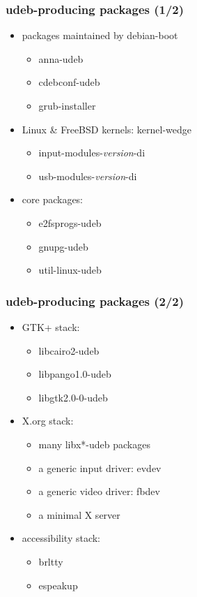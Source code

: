 \documentclass[handout]{beamer}
\begin{document}
\begin{frame}[fragile]
  \frametitle{udeb-producing packages (1/2)}

  \begin{itemize}
  \item packages maintained by debian-boot
    \begin{itemize}
    \item anna-udeb
    \item cdebconf-udeb
    \item grub-installer
    \end{itemize}
  \pause
  \item Linux \& FreeBSD kernels: kernel-wedge
    \begin{itemize}
    \item input-modules-\textit{version}-di
    \item usb-modules-\textit{version}-di
    \end{itemize}
  \pause
  \item core packages:
    \begin{itemize}
    \item e2fsprogs-udeb
    \item gnupg-udeb
    \item util-linux-udeb
    \end{itemize}
  \end{itemize}
\end{frame}

\begin{frame}[fragile]
  \frametitle{udeb-producing packages (2/2)}

  \begin{itemize}
  \item GTK+ stack:
    \begin{itemize}
    \item libcairo2-udeb
    \item libpango1.0-udeb
    \item libgtk2.0-0-udeb
    \end{itemize}
  \pause
  \item X.org stack:
    \begin{itemize}
    \item many libx*-udeb packages
    \item a generic input driver: evdev
    \item a generic video driver: fbdev
    \item a minimal X server
    \end{itemize}
  \pause
  \item accessibility stack:
    \begin{itemize}
    \item brltty
    \item espeakup
    \end{itemize}
  \end{itemize}
\end{frame}
\end{document}

